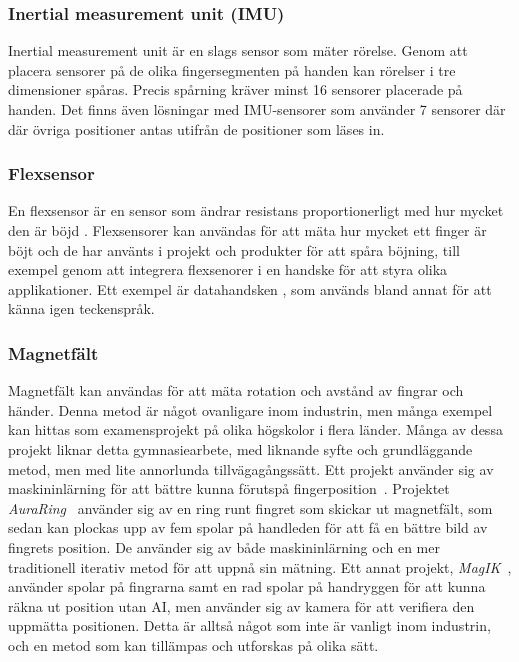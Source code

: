 \documentclass[a4paper]{article}
\begin{document}
\begin{sloppypar}
    \subsubsection{Inertial measurement unit (IMU)}
    Inertial measurement unit är en slags sensor som mäter rörelse. Genom att
    placera sensorer på de olika fingersegmenten på handen kan rörelser i tre
    dimensioner spåras. Precis spårning kräver minst 16 sensorer placerade på
    handen. Det finns även lösningar med IMU-sensorer som använder 7 sensorer
    där där övriga positioner antas utifrån de positioner som läses in.\cite{wiki:Finger_tracking}

    \subsubsection{Flexsensor}
    En flexsensor är en sensor som ändrar resistans proportionerligt med hur mycket den är böjd \cite{wiki:Flex_sensor}.
    Flexsensorer kan användas för att mäta hur mycket ett finger är böjt och de har använts i projekt och produkter för att spåra böjning, till exempel genom att integrera flexsenorer i en handske för att styra olika applikationer. Ett exempel är datahandsken \cite{wiki:Wired_glove}, som används bland annat för att känna igen teckenspråk.

    \subsubsection{Magnetfält}
    Magnetfält kan användas för att mäta rotation och avstånd av fingrar och händer.
    Denna metod är något ovanligare inom industrin, men många exempel kan hittas som examensprojekt på olika högskolor i flera länder.
    Många av dessa projekt liknar detta gymnasiearbete, med liknande syfte och grundläggande metod, men med lite annorlunda tillvägagångssätt.
    Ett projekt använder sig av maskininlärning för att bättre kunna förutspå fingerposition~\cite{article:sci-rep-mag-ind}.
    Projektet \textit{AuraRing}~\cite{article:AuraRing} använder sig av en ring runt fingret som skickar ut magnetfält, som sedan kan plockas upp av fem spolar på handleden för att få en bättre bild av fingrets position.
    De använder sig av både maskininlärning och en mer traditionell iterativ metod för att uppnå sin mätning.
    Ett annat projekt, \textit{MagIK}~\cite{article:MagIK}, använder spolar på fingrarna samt en rad spolar på handryggen för att kunna räkna ut position utan AI, men använder sig av kamera för att verifiera den uppmätta positionen.
    Detta är alltså något som inte är vanligt inom industrin, och en metod som kan tillämpas och utforskas på olika sätt.



\end{sloppypar}
\end{document}

